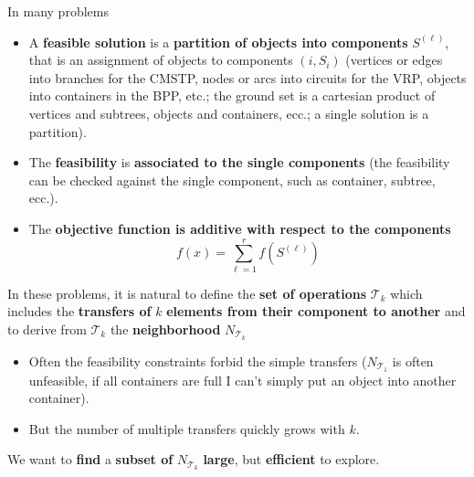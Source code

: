 In many problems
\begin{itemize}
	\item A \textbf{feasible solution} is a \textbf{partition of objects into components} $S^{(\ell)}$, that is an assignment of objects to components $(i, S_i )$ (vertices or edges into branches for the CMSTP, nodes or arcs into circuits for the VRP, objects into containers in the BPP, etc.; the ground set is a cartesian product of vertices and subtrees, objects and containers, ecc.; a single solution is a partition).\\
	
	\item The \textbf{feasibility} is \textbf{associated to the single components} (the feasibility can be checked against the single component, such as container, subtree, ecc.).\\
	
	\item The \textbf{objective function is additive with respect to the components}
	$$ f (x) = \sum_{\ell = 1}^{r} f \left(S^{(\ell)} \right)$$
\end{itemize}

In these problems, it is natural to define the \textbf{set of operations} $\mathcal{T}_k$ which includes the \textbf{transfers of} $k$ \textbf{elements from their component to another} and to derive from $\mathcal{T}_k$ the \textbf{neighborhood} $N_{\mathcal{T}_k}$
\begin{itemize}
	\item Often the feasibility constraints forbid the simple transfers ($N_{\mathcal{T}_1}$ is often unfeasible, if all containers are full I can't simply put an object into another container).\\
	
	\item But the number of multiple transfers quickly grows with $k$.\\
\end{itemize}
We want to \textbf{find} a \textbf{subset of} $N_{\mathcal{T}_k}$ \textbf{large}, but \textbf{efficient} to explore.\\

\newpage


